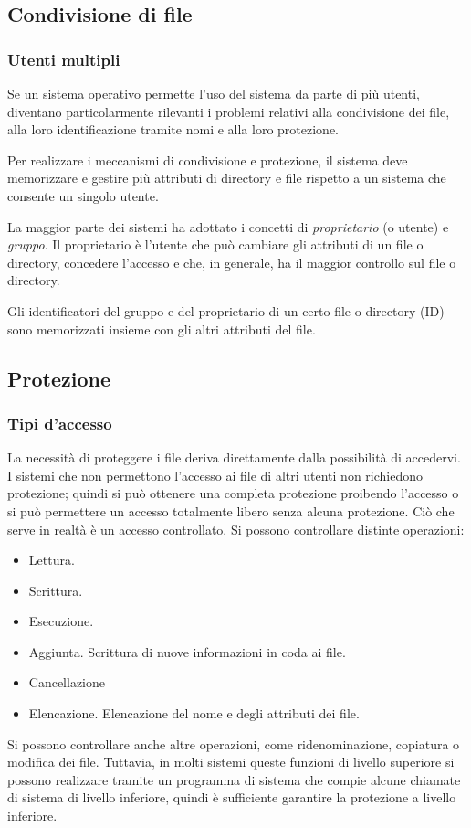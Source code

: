 \documentclass[11pt,a4paper]{article}
\begin{document}
{\subsection{Condivisione di file}
\subsubsection{Utenti multipli}
Se un sistema operativo permette l'uso del sistema da parte di più utenti, diventano particolarmente rilevanti i problemi relativi alla condivisione dei file, alla loro identificazione tra­mite nomi e alla loro protezione.

Per realizzare i meccanismi di condivisione e protezione, il sistema deve memorizzare e
gestire più attributi di directory e file rispetto a un sistema che consente un singolo utente.

La maggior parte dei sistemi ha adottato i concetti di \emph{proprietario} (o utente) e \emph{gruppo}. Il proprietario è l'utente che può cambiare gli attributi di un file o directory, concedere l'accesso e che, in generale, ha il maggior control­lo sul file o directory.

Gli identificatori del gruppo e del proprietario di un certo file o directory (ID) sono
memorizzati insieme con gli altri attributi del file.

\subsection{Protezione}
\subsubsection{Tipi d'accesso}
La necessità di proteggere i file deriva direttamente dalla possibilità di accedervi. I sistemi
che non permettono l'accesso ai file di altri utenti non richiedono protezione; quindi si può
ottenere una completa protezione proibendo l'accesso o si può permettere un
accesso totalmente libero senza alcuna protezione. Ciò che serve in realtà è un accesso con­trollato.
Si possono controllare distinte operazioni:
\begin{itemize}
  \item Lettura.
  \item Scrittura.
  \item Esecuzione.
  \item Aggiunta. Scrittura di nuove informazioni in coda ai file.
  \item Cancellazione
  \item Elencazione. Elencazione del nome e degli attributi dei file.
\end{itemize}
Si possono controllare anche altre operazioni, come ridenominazione, copiatura o modifica
dei file. Tuttavia, in molti sistemi queste funzioni di livello superiore si possono realizzare
tramite un programma di sistema che compie alcune chiamate di sistema di livello inferiore,
quindi è sufficiente garantire la protezione a livello inferiore.

}
\end{document}
